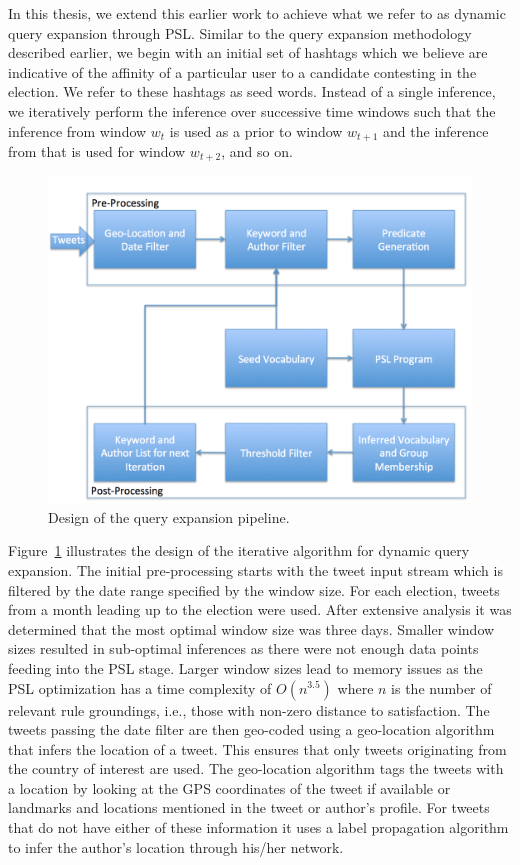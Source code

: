 In this thesis, we extend this earlier work to achieve what we refer to as dynamic query expansion through PSL. 
Similar to the query expansion methodology described earlier, we begin with an initial set of 
hashtags which we believe are indicative of the affinity of a particular user to a candidate 
contesting in the election.
We refer to these hashtags as seed words.
Instead of a single inference, we iteratively perform the inference over successive time windows such that the inference from window $w_t$ is used as a prior to window $w_{t+1}$ and the inference from that is used for window $w_{t+2}$, and so on.
\begin{figure}[Ht]
	\centering
	\includegraphics[height=0.5\textheight, width=1.0\textwidth]{support_files/flowChart.png}
	\caption{Design of the query expansion pipeline.}
	\label{fig:flowchart}
\end{figure}
Figure~\ref{fig:flowchart} illustrates the design of the iterative algorithm for dynamic query expansion.
The initial pre-processing starts with the tweet input stream which is filtered by the date range specified by the window size. 
For each election, tweets from a month leading up to the election were used.
After extensive analysis it was determined that the most optimal window size was three days. 
Smaller window sizes resulted in sub-optimal inferences as there were not enough data points feeding into the PSL stage.
Larger window sizes lead to memory issues as the PSL optimization has a time complexity of  $O(n^{3.5})$ where $n$ is the number of relevant rule groundings, i.e., those with non-zero distance to satisfaction. 
The tweets passing the date filter are then geo-coded using a geo-location algorithm that infers the location of a tweet. 
This ensures that only tweets originating from the country of interest are used.
The geo-location algorithm tags the tweets with a location by looking at the GPS coordinates of the tweet if available or landmarks and locations mentioned in the tweet or author's profile. 
For tweets that do not have either of these information it uses a label propagation algorithm to infer the author's location through his/her network.

